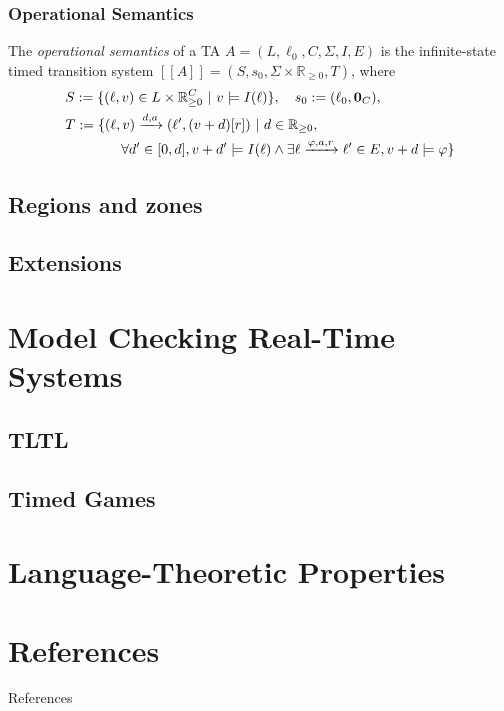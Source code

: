 \documentclass{beamer}
\theoremstyle{definition}
\begin{document}
\begin{frame}
  \frametitle{Operational Semantics}
\begin{definition}
  \small
  The \emph{operational semantics} of a TA $A = (L, \ell_0, C, \Sigma, I, E)$ is the infinite-state timed transition system $[\![A]\!] = (S, s_0, \Sigma \times \mathbb{R}_{\geq 0}, T)$, where
  \begin{align*}
	  &S := \{(\ell, v) \in L \times \mathbb{R}_{\geq 0}^C\ |\ v \models I(\ell)\}, \quad s_0 := (\ell_0, \text{\bf 0}_C),\\
	  &T := \{(\ell, v) \xrightarrow{d, a} (\ell', (v+d)[r]) \ | \ d \in \mathbb{R}_{\geq 0}, \\
    &\quad\quad\quad\quad\forall d' \in [0, d], v + d' \models I(\ell) \land \exists \ell \xrightarrow{\varphi, a, r} \ell' \in E, v + d \models \varphi \}
  \end{align*}
\end{definition}
\end{frame}

\subsection{Regions and zones}
\subsection{Extensions}

\section{Model Checking Real-Time Systems}
\subsection{TLTL}
\subsection{Timed Games}

\section{Language-Theoretic Properties}

\section{References}
\begin{frame}{References}
  
  
\end{frame}
\end{document}
